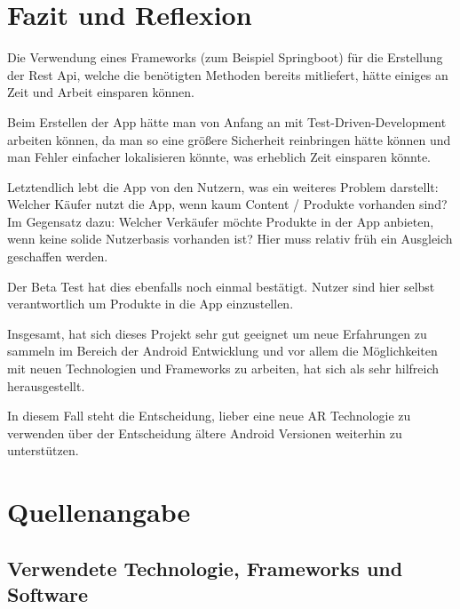 \documentclass{scrartcl}
\begin{document}
\section{Fazit und Reflexion}

\noindent Die Verwendung eines Frameworks (zum Beispiel Springboot) für die Erstellung der Rest Api, welche die benötigten Methoden bereits mitliefert, hätte einiges an Zeit und Arbeit einsparen können. \newline 

\noindent Beim Erstellen der App hätte man von Anfang an mit Test-Driven-Development arbeiten können, da man so eine größere Sicherheit reinbringen hätte können und man Fehler einfacher lokalisieren könnte, was erheblich Zeit einsparen könnte. \newline 

\noindent Letztendlich lebt die App von den Nutzern, was ein weiteres Problem darstellt: \newline Welcher Käufer nutzt die App, wenn kaum Content / Produkte vorhanden sind? Im Gegensatz dazu: Welcher Verkäufer möchte Produkte in der App anbieten, wenn keine solide Nutzerbasis vorhanden ist? Hier muss relativ früh ein Ausgleich geschaffen werden. 

\noindent Der Beta Test hat dies ebenfalls noch einmal bestätigt. Nutzer sind hier selbst verantwortlich um Produkte in die App einzustellen. \newline 

\noindent Insgesamt, hat sich dieses Projekt sehr gut geeignet um neue Erfahrungen zu sammeln im Bereich der Android Entwicklung und vor allem die Möglichkeiten mit neuen Technologien und Frameworks zu arbeiten, hat sich als sehr hilfreich herausgestellt. \newline

\noindent In diesem Fall steht die Entscheidung, lieber eine neue AR Technologie zu verwenden über der Entscheidung ältere Android Versionen weiterhin zu unterstützen. \newline

\newpage

\section{Quellenangabe}

\subsection{Verwendete Technologie, Frameworks und Software}
\end{document}
